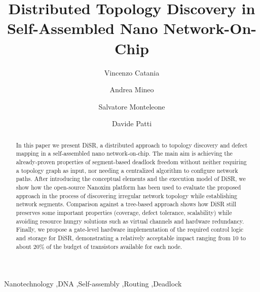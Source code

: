\documentclass[preprint]{elsarticle}
\newcommand{\disr}{{\sf DiSR}}
\begin{document}
\begin{frontmatter}

\title{Distributed Topology Discovery in Self-Assembled Nano Network-On-Chip}

\author{Vincenzo Catania}
\author{Andrea Mineo}
\author{Salvatore Monteleone}
\author{Davide Patti}
\address{DIEEI, University of Catania, v.le Andrea Doria 6, 95125 Catania, Italy}






\begin{abstract}
In this paper we present \disr{}, a distributed approach to topology
discovery and defect mapping in a self-assembled nano
network-on-chip. The main aim is achieving the already-proven
properties of segment-based deadlock freedom without neither requiring
a topology graph as input, nor needing a centralized algorithm to
configure network paths.  After introducing the conceptual elements
and the execution model of \disr{}, we show how the open-source Nanoxim
platform has been used to evaluate the proposed approach in the
process of discovering irregular network topology while establishing
network segments. Comparison against a tree-based approach shows how
\disr{} still preserves some important properties (coverage, defect
tolerance, scalability) while avoiding resource hungry solutions such
as virtual channels and hardware redundancy. Finally, we propose a
gate-level hardware implementation of the required control logic and
storage for \disr{}, demonstrating a relatively acceptable impact
ranging from 10 to about 20\% of the budget of transistors available
for each node.
\end{abstract}

\begin{keyword}
Nanotechnology \sep DNA \sep Self-assembly \sep Routing \sep Deadlock
\end{keyword}
\end{frontmatter}
\end{document}
